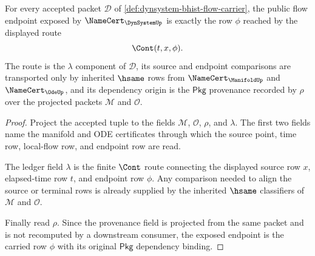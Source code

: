 \begin{theorem}
\label{thm:dynsystem-public-flow-endpoint-exactness}
For every accepted packet $\mathcal{D}$ of \autoref{def:dynsystem-bhist-flow-carrier}, the public flow endpoint exposed by $\NameCert_{\DynSystemUp}$ is exactly the row $\phi$ reached by the displayed route
$$
\Cont(t,x,\phi).
$$
The route is the $\lambda$ component of $\mathcal{D}$, its source and endpoint comparisons are transported only by inherited $\hsame$ rows from $\NameCert_{\ManifoldUp}$ and $\NameCert_{\OdeUp}$, and its dependency origin is the $\mathsf{Pkg}$ provenance recorded by $\rho$ over the projected packets $\mathcal{M}$ and $\mathcal{O}$.
\end{theorem}
\begin{proof}
Project the accepted tuple to the fields $\mathcal{M}$, $\mathcal{O}$, $\rho$, and $\lambda$. The first two fields name the manifold and ODE certificates through which the source point, time row, local-flow row, and endpoint row are read.

The ledger field $\lambda$ is the finite $\Cont$ route connecting the displayed source row $x$, elapsed-time row $t$, and endpoint row $\phi$. Any comparison needed to align the source or terminal rows is already supplied by the inherited $\hsame$ classifiers of $\mathcal{M}$ and $\mathcal{O}$.

Finally read $\rho$. Since the provenance field is projected from the same packet and is not recomputed by a downstream consumer, the exposed endpoint is the carried row $\phi$ with its original $\mathsf{Pkg}$ dependency binding.
\end{proof}

